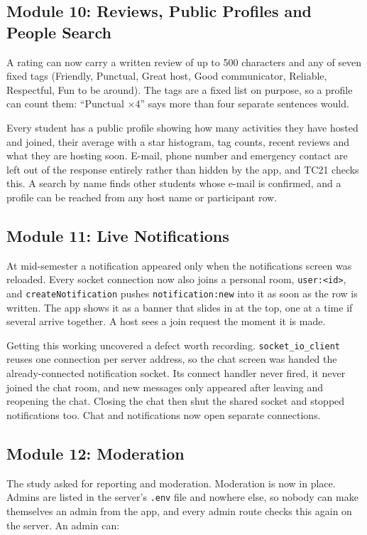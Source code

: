 \documentclass{tietreport}
\begin{document}
\subsection{Module 10: Reviews, Public Profiles and People Search}

A rating can now carry a written review of up to 500 characters and any of seven fixed
tags (Friendly, Punctual, Great host, Good communicator, Reliable, Respectful, Fun to be
around). The tags are a fixed list on purpose, so a profile can count them: ``Punctual
$\times$4'' says more than four separate sentences would.

Every student has a public profile showing how many activities they have hosted and
joined, their average with a star histogram, tag counts, recent reviews and what they are
hosting soon. E-mail, phone number and emergency contact are left out of the response
entirely rather than hidden by the app, and TC21 checks this. A search by name finds other
students whose e-mail is confirmed, and a profile can be reached from any host name or participant row.

\subsection{Module 11: Live Notifications}

At mid-semester a notification appeared only when the notifications screen was reloaded.
Every socket connection now also joins a personal room, \texttt{user:<id>}, and
\texttt{createNotification} pushes \texttt{notification:new} into it as soon as the row is
written. The app shows it as a banner that slides in at the top, one at a time if several
arrive together. A host sees a join request the moment it is made.

Getting this working uncovered a defect worth recording. \texttt{socket\_io\_client} reuses
one connection per server address, so the chat screen was handed the already-connected
notification socket. Its connect handler never fired, it never joined the chat room, and
new messages only appeared after leaving and reopening the chat. Closing the chat then shut
the shared socket and stopped notifications too. Chat and notifications now open separate
connections.

\subsection{Module 12: Moderation}

The study asked for reporting and moderation. Moderation is now in place. Admins are listed
in the server's \texttt{.env} file and nowhere else, so nobody can make themselves an admin
from the app, and every admin route checks this again on the server. An admin can:
\end{document}
